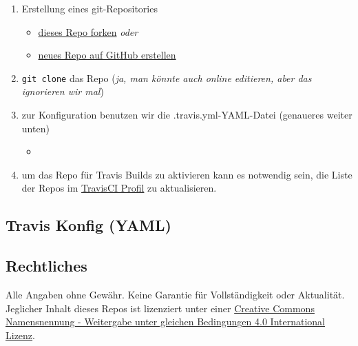 \documentclass[]{article}
\providecommand{\tightlist}{
  \setlength{\itemsep}{0pt}\setlength{\parskip}{0pt}}
\begin{document}
\begin{enumerate}
\def\labelenumi{\arabic{enumi}.}
\tightlist
\item
  Erstellung eines git-Repositories

  \begin{itemize}
  \tightlist
  \item
    \href{https://github.com/SimonWaldherr/testrepo\#fork-destination-box}{dieses
    Repo forken} \emph{oder}
  \item
    \href{https://github.com/new}{neues Repo auf GitHub erstellen}
  \end{itemize}
\item
  \texttt{git\ clone} das Repo (\emph{ja, man könnte auch online
  editieren, aber das ignorieren wir mal})
\item
  zur Konfiguration benutzen wir die .travis.yml-YAML-Datei (genaueres
  weiter unten)

  \begin{itemize}
  \item
  \end{itemize}
\item
  um das Repo für Travis Builds zu aktivieren kann es notwendig sein,
  die Liste der Repos im \href{https://travis-ci.org/profile}{TravisCI
  Profil} zu aktualisieren.
\end{enumerate}

\subsection{Travis Konfig (YAML)}\label{travis-konfig-yaml}



\subsection{Rechtliches}\label{rechtliches}

Alle Angaben ohne Gewähr. Keine Garantie für Vollständigkeit oder
Aktualität. Jeglicher Inhalt dieses Repos ist lizenziert unter einer
\href{http://creativecommons.org/licenses/by-sa/4.0/}{Creative Commons
Namensnennung - Weitergabe unter gleichen Bedingungen 4.0 International
Lizenz}.
\end{document}
